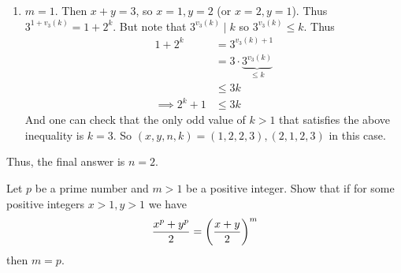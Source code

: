 \begin{solution}
\begin{enumerate}
                \item $m=1$. Then $x+y=3$, so $x=1, y=2$ (or $x=2, y=1$). Thus $3^{1+v_3(k)}= 1+2^k$. But note that
                $3^{v_3(k)} \mid k$ so $3^{v_3(k)} \leq k$. Thus
                	\begin{align*}
                		1+2^k
                			& = 3^{v_3(k)+1}\\
                			& = 3 \cdot \underbrace{3^{v_3(k)}}_{\leq k}\\
                			& \leq 3k\\
                		\implies 2^k +1
                			& \leq 3k
                	\end{align*}
                And one can check that the only odd value of $k>1$ that satisfies the above inequality is $k=3$. So $(x,y,n,k)=(1,2,2,3), (2,1,2,3)$ in this case.
            \end{enumerate}
    Thus, the final answer is $n=2.$

    \end{solution}

    \begin{problem}[Balkan 1993]
        Let $p$ be a prime number and $m>1$ be a positive integer. Show that if for some positive integers $x>1, y>1$ we have
        \begin{align*}
	        \frac{x^p+y^p}{2}= \left(\frac{x+y}{2}\right)^m
        \end{align*}
        then $m=p.$
    \end{problem}

